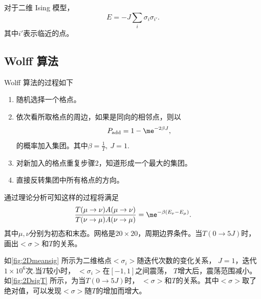 \documentclass[12pt]{article}
\begin{document}
对于二维 Ising 模型，
\begin{equation}
	E = -J \sum_i \sigma_i \sigma_{i'}.
\end{equation}
其中$i'$表示临近的点。

\subsection{Wolff 算法}

Wolff 算法的过程如下

\begin{enumerate}
	\item 随机选择一个格点。
	\item 依次看所取格点的周边，如果是同向的相邻点，则以
	      \begin{equation}
		      P_{\mathrm{add}} = 1 - \me^{-2\beta J},
	      \end{equation}
	      的概率加入集团。其中$\beta=\frac{1}{T},\ J=1$.
	\item 对新加入的格点重复步骤2，知道形成一个最大的集团。
	\item 直接反转集团中所有格点的方向。
\end{enumerate}

通过理论分析可知这样的过程将满足
\begin{equation}
	\frac{T(\mu\to\nu)A(\mu\to\nu)}{T(\nu\to\mu)A(\nu\to\mu)} = \me^{-\beta\left(E_{\nu}-E_{\mu}\right)}.
\end{equation}
其中$\mu,\nu$分别为初态和末态。网格是$20\times 20$，周期边界条件。当$T(0\to 5J)$时，画出$<\sigma>$和$T$的关系。

如\cref{fig:2Dmeansig} 所示为二维格点$<\sigma_i>$随迭代次数的变化关系， $J=1$，迭代$1\times 10^{6}$次.当$T$较小时， $<\sigma_i>$在$[-1,1]$之间震荡， $T$增大后，震荡范围减小。如\cref{fig:2DsigT} 所示，为当$T(0\to 5J)$时， $<\sigma>$和$T$的关系。其中$<\sigma>$取了绝对值，可以发现$<\sigma>$随$T$的增加而增大。
\end{document}
